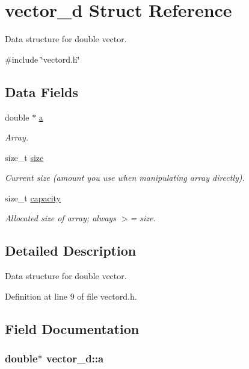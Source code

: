 \hypertarget{structvector__d}{\section{vector\-\_\-d \-Struct \-Reference}
\label{structvector__d}
}


\-Data structure for double vector.  




{\ttfamily \#include \char`\"{}vectord.\-h\char`\"{}}

\subsection*{\-Data \-Fields}
\begin{DoxyCompactItemize}
\item 
double $\ast$ \hyperlink{structvector__d_a925832a4ece20022fbe241e7e38ec329}{a}
\begin{DoxyCompactList}\small\item\em \-Array. \end{DoxyCompactList}\item 
size\-\_\-t \hyperlink{structvector__d_a1a8bccf26d9cef41fd453f6feb2f15b1}{size}
\begin{DoxyCompactList}\small\item\em \-Current size (amount you use when manipulating array directly). \end{DoxyCompactList}\item 
size\-\_\-t \hyperlink{structvector__d_a83fb5c9689de179f0dfe1413d720cdc3}{capacity}
\begin{DoxyCompactList}\small\item\em \-Allocated size of array; always $>$= size. \end{DoxyCompactList}\end{DoxyCompactItemize}


\subsection{\-Detailed \-Description}
\-Data structure for double vector. 



\-Definition at line 9 of file vectord.\-h.



\subsection{\-Field \-Documentation}
\hypertarget{structvector__d_a925832a4ece20022fbe241e7e38ec329}{
\subsubsection[{a}]{\setlength{\rightskip}{0pt plus 5cm}double$\ast$ {\bf vector\-\_\-d\-::a}}}\label{structvector__d_a925832a4ece20022fbe241e7e38ec329}



